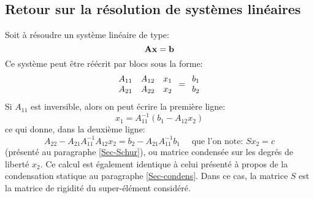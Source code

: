    \subsection{Retour sur la résolution de systèmes linéaires}
\fi
Soit à résoudre un système linéaire de type:
\begin{equation}\label{Eq-lin} \mathbf{A}\mathbf{x}=\mathbf{b} \end{equation}
Ce système peut être réécrit par blocs sous la forme:
\begin{equation} 
\mathbf{\begin{array}{cc} A_{11} & A_{12}\\ A_{21} & A_{22} \end{array}}
\mathbf{\begin{array}{c} x_1 \\ x_2 \end{array}} =
\mathbf{\begin{array}{c} b_1\\ b_2 \end{array}}
\end{equation}
\medskipvm
Si $A_{11}$ est inversible, alors on peut écrire la première ligne:
\begin{equation}
x_1 = A_{11}^{-1}\left( b_1-A_{12}x_2 \right)
\end{equation}
ce qui donne, dans la deuxième ligne:
\begin{equation}
A_{22} - A_{21}A_{11}^{-1}A_{12}x_2 = b_2 - A_{21}A_{11}^{-1}b_1
\quad \text{ que l'on note: }
S x_2=c
\end{equation}
(présenté au paragraphe \ref{Sec-Schur}), ou matrice condensée sur les degrés de liberté $x_2$.
Ce calcul est également identique à celui présenté à propos de la condensation statique au paragraphe \ref{Sec-condens}.
Dans ce cas, la matrice $S$ est la matrice de rigidité du super-élément considéré.

